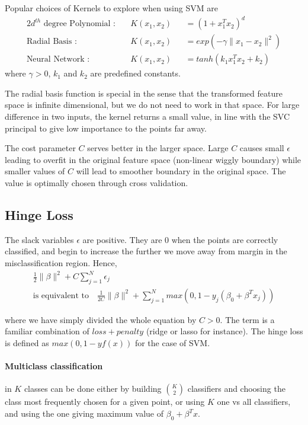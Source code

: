 \documentclass[../statistical_learning_notes.tex]{subfiles}
\begin{document}
    Popular choices of Kernels to explore when using SVM are
    \begin{alignat*}{2}
        \text{$d^{th}$ degree Polynomial :} &\quad K(x_{1}, x_{2}) &&= (1 + x_{1}^{T}x_{2})^{d}\\
        \text{Radial Basis :} &\quad K(x_{1}, x_{2}) &&= exp(-\gamma \lVert x_{1} - x_{2} \rVert^{2})\\
        \text{Neural Network :} &\quad K(x_{1}, x_{2}) &&= tanh(k_{1} x_{1}^{T}x_{2} + k_{2})
    \end{alignat*}
    where $\gamma>0$, $k_{1}$ and $k_{2}$ are predefined constants.\newline

    The radial basis function is special in the sense that the transformed feature space is infinite dimensional, but we do not need to work in that space. For large difference in two inputs, the kernel returns a small value, in line with the SVC principal to give low importance to the points far away.\newline

    The cost parameter $C$ serves better in the larger space. Large $C$ causes small $\epsilon$ leading to overfit in the original feature space (non-linear wiggly boundary) while smaller values of $C$ will lead to smoother boundary in the original space. The value is optimally chosen through cross validation.


    \subsection{Hinge Loss}
    The slack variables $\epsilon$ are positive. They are $0$ when the points are correctly classified, and begin to increase the further we move away from margin in the misclassification region. Hence,
    \begin{gather*}
        \frac{1}{2}\lVert \beta \rVert^{2} + C\sum_{j=1}^{N}\epsilon_{j}\\
        \text{is equivalent to} \quad \frac{1}{2C}\lVert \beta \rVert^{2} + \sum_{j=1}^{N} max(0, 1 - y_{j}(\beta_{0} + \beta^{T}x_{j}))
    \end{gather*}

    where we have simply divided the whole equation by $C > 0$. The term is a familiar combination of $loss + penalty$ (ridge or lasso for instance). The hinge loss is defined as $max(0, 1 - yf(x))$ for the case of SVM.

    \paragraph{Multiclass classification} in $K$ classes can be done either by building $\binom{K}{2}$ classifiers and choosing the class most frequently chosen for a given point, or using $K$ one vs all classifiers, and using the one giving maximum value of $\beta_{0} + \beta^{T}x$.
\end{document}
